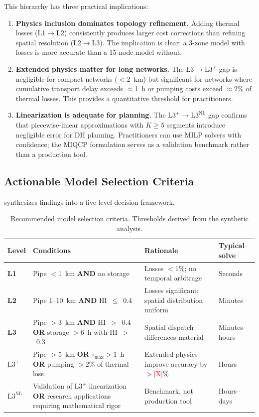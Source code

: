 \documentclass[review,3p]{elsarticle}
\newcommand{\placeholder}[1]{\textcolor{red}{[#1]}}
\newcommand{\Lplus}{\mathrm{L3}^{+}}
\newcommand{\Lnl}{\mathrm{L3}^{\mathrm{NL}}}
\begin{document}
This hierarchy has three practical implications:

\begin{enumerate}
    \item \textbf{Physics inclusion dominates topology refinement.}
    Adding thermal losses (L1$\to$L2) consistently produces larger
    cost corrections than refining spatial resolution (L2$\to$L3).
    The implication is clear: a 3-zone model with losses is more
    accurate than a 15-node model without.

    \item \textbf{Extended physics matter for long networks.} The
    L3$\to\Lplus$ gap is negligible for compact networks
    ($<$2~km) but significant for networks where cumulative
    transport delay exceeds $\approx$1~h or pumping costs exceed
    $\approx$2\% of thermal losses. This provides a quantitative
    threshold for practitioners.

    \item \textbf{Linearization is adequate for planning.} The
    $\Lplus\to\Lnl$ gap confirms that piecewise-linear
    approximations with $K \geq 5$ segments introduce negligible
    error for DH planning. Practitioners can use MILP solvers
    with confidence; the MIQCP formulation serves as a validation
    benchmark rather than a production tool.
\end{enumerate}

\subsection{Actionable Model Selection Criteria}
\label{sec:disc_criteria}

 synthesizes findings into a five-level
decision framework.

\begin{table}[htbp]
\centering
\caption{Recommended model selection criteria. Thresholds derived
from the synthetic analysis.}
\label{tab:criteria}
\begin{tabular}{@{}p{1.3cm}p{6.0cm}p{4.0cm}p{2.5cm}@{}}
\toprule
Level & Conditions & Rationale & Typical solve \\
\midrule
\textbf{L1}
  & Pipe $<$1~km \textbf{AND} no storage
  & Losses $<$1\%; no temporal arbitrage
  & Seconds \\[4pt]
\textbf{L2}
  & Pipe 1--10~km \textbf{AND} HI~$\leq$~0.4
  & Losses significant; spatial distribution uniform
  & Minutes \\[4pt]
\textbf{L3}
  & Pipe $>$3~km \textbf{AND} HI~$>$~0.4 \textbf{OR}
  storage $>$6~h with HI~$>$~0.3
  & Spatial dispatch differences material
  & Minutes--hours \\[4pt]
$\Lplus$
  & Pipe $>$5~km \textbf{OR} $\tau_{\max} > 1$~h
  \textbf{OR} pumping $>$2\% of thermal loss
  & Extended physics improve accuracy
  by $>$\placeholder{X}\%
  & Hours \\[4pt]
$\Lnl$
  & Validation of $\Lplus$ linearization
  \textbf{OR} research applications requiring
  mathematical rigor
  & Benchmark, not production tool
  & Hours--days \\
\bottomrule
\end{tabular}
\end{table}
\end{document}
